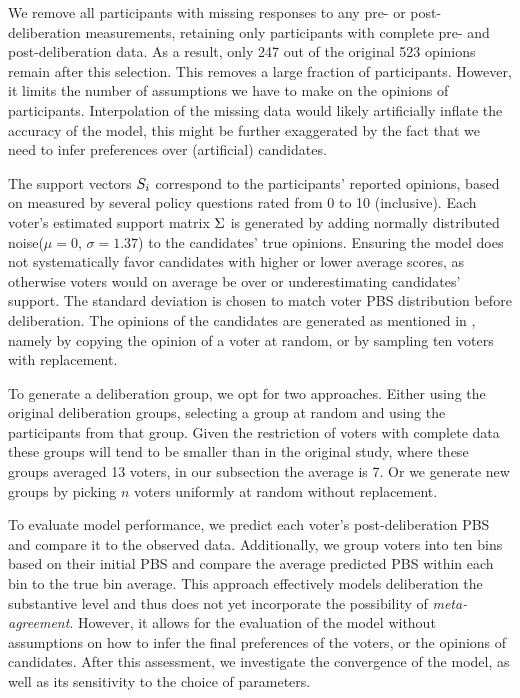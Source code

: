 We remove all participants with missing responses to any pre- or
post-deliberation measurements, retaining only participants with complete pre-
and post-deliberation data. As a result, only 247 out of the original 523
opinions remain after this selection. This removes a large fraction of
participants. However, it limits the number of assumptions we have to make on
the opinions of participants.  Interpolation of the missing data would likely
artificially inflate the accuracy of the model, this might be further
exaggerated by the fact that we need to infer preferences over (artificial)
candidates.

The support vectors $S_i$ correspond to the participants' reported
opinions, based on measured by several policy questions rated from 0 to 10
(inclusive). Each voter's estimated support matrix $\Sigma$ is generated
by adding normally distributed noise($\mu=0$, $\sigma=1.37$) to the candidates'
true opinions. Ensuring the model does not systematically favor candidates with
higher or lower average scores, as otherwise voters would on average be over
or underestimating candidates' support. The standard deviation is chosen to
match voter PBS distribution before deliberation. The opinions of the
candidates are generated as mentioned in , namely by copying the
opinion of a voter at random, or by sampling ten voters with replacement.


To generate a deliberation group, we opt for two approaches. Either using the
original deliberation groups, selecting a group at random and using the
participants from that group. Given the restriction of voters with complete
data these groups will tend to be smaller than in the original study, where
these groups averaged 13 voters, in our subsection the average is 7. Or we
generate new groups by picking $n$ voters uniformly at random without
replacement.

To evaluate model performance, we predict each voter's post-deliberation PBS
and compare it to the observed data. Additionally, we group voters into ten bins
based on their initial PBS and compare the average predicted PBS within each
bin to the true bin average. This approach effectively models deliberation the
substantive level and thus does not yet incorporate the possibility of
\textit{meta-agreement}. However, it allows for the evaluation of the model
without assumptions on how to infer the final preferences of the voters, or
the opinions of candidates. After this assessment, we investigate the
convergence of the model, as well as its sensitivity to the choice of
parameters.

